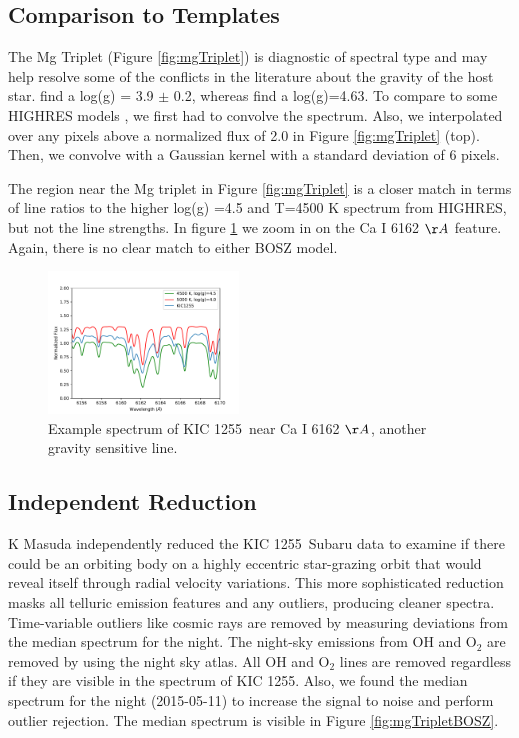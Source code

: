 \documentclass[preprint]{aastex61}
\newcommand{\shStar}{KIC 1255}
\begin{document}
\subsection{Comparison to Templates}

The Mg Triplet (Figure \ref{fig:mgTriplet}) is diagnostic of spectral type and may help resolve some of the conflicts in the literature about the gravity of the host star.
\citet{kawahara2013starspots} find a log(g) = 3.9 $\pm$ 0.2, whereas \citet{rappaport} find a log(g)=4.63.
To compare to some HIGHRES models \citep{coelho2014hires}, we first had to convolve the spectrum.
Also, we interpolated over any pixels above a normalized flux of 2.0 in Figure \ref{fig:mgTriplet} (top).
Then, we convolve with a Gaussian kernel with a standard deviation of 6 pixels.

The region near the Mg triplet in Figure \ref{fig:mgTriplet} is a closer match in terms of line ratios to the higher log(g) =4.5 and T=4500 K spectrum from HIGHRES, but not the line strengths.
In figure \ref{fig:CaILine} we zoom in on the Ca I 6162 $\AA$ feature.
Again, there is no clear match to either BOSZ model.

\begin{figure}[!hbtp]
\begin{centering}
\includegraphics[width=0.45\textwidth]{images/subaru/CaI6162_spec.pdf}
\caption{Example spectrum of \shStar\ near Ca I 6162 $\AA$, another gravity sensitive line.}\label{fig:CaILine}
\end{centering}
\end{figure}

\subsection{Independent Reduction}
K Masuda independently reduced the \shStar\ Subaru data to examine if there could be an orbiting body on a highly eccentric star-grazing orbit that would reveal itself through radial velocity variations.
This more sophisticated reduction masks all telluric emission features and any outliers, producing cleaner spectra.
Time-variable outliers like cosmic rays are removed by measuring deviations from the median spectrum for the night.
The night-sky emissions from OH and O$_2$ are removed by using the \citet{osterbrock1996lineAtlas} night sky atlas.
All OH and O$_2$ lines are removed regardless if they are visible in the spectrum of \shStar.
Also, we found the median spectrum for the night (2015-05-11) to increase the signal to noise and perform outlier rejection.
The median spectrum is visible in Figure \ref{fig:mgTripletBOSZ}.
\end{document}
